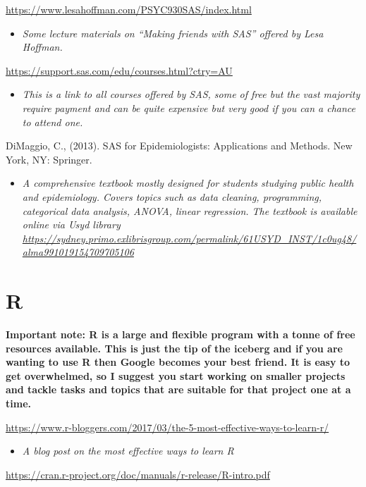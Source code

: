 \documentclass[
]{book}
\providecommand{\tightlist}{%
  \setlength{\itemsep}{0pt}\setlength{\parskip}{0pt}}
\begin{document}
\url{https://www.lesahoffman.com/PSYC930SAS/index.html}

\begin{itemize}
\tightlist
\item
  \emph{Some lecture materials on ``Making friends with SAS'' offered by Lesa Hoffman.}
\end{itemize}

\url{https://support.sas.com/edu/courses.html?ctry=AU}

\begin{itemize}
\tightlist
\item
  \emph{This is a link to all courses offered by SAS, some of free but the vast majority require payment and can be quite expensive but very good if you can a chance to attend one.}
\end{itemize}

DiMaggio, C., (2013). SAS for Epidemiologists: Applications and Methods. New York, NY: Springer.

\begin{itemize}
\tightlist
\item
  \emph{A comprehensive textbook mostly designed for students studying public health and epidemiology. Covers topics such as data cleaning, programming, categorical data analysis, ANOVA, linear regression. The textbook is available online via Usyd library \url{https://sydney.primo.exlibrisgroup.com/permalink/61USYD_INST/1c0ug48/alma991019154709705106}}
\end{itemize}

\section{R}\label{r}

\textbf{Important note: R is a large and flexible program with a tonne of free resources available. This is just the tip of the iceberg and if you are wanting to use R then Google becomes your best friend. It is easy to get overwhelmed, so I suggest you start working on smaller projects and tackle tasks and topics that are suitable for that project one at a time. }

\url{https://www.r-bloggers.com/2017/03/the-5-most-effective-ways-to-learn-r/}

\begin{itemize}
\tightlist
\item
  \emph{A blog post on the most effective ways to learn R}
\end{itemize}

\url{https://cran.r-project.org/doc/manuals/r-release/R-intro.pdf}
\end{document}
